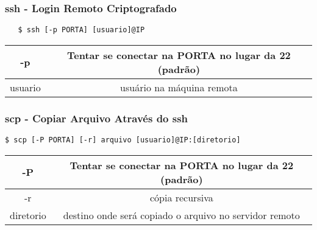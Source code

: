 \documentclass{beamer}
\begin{document}
\begin{frame}[fragile]
   \frametitle{ssh - Login Remoto Criptografado}
   \begin{verbatim}
   $ ssh [-p PORTA] [usuario]@IP
   \end{verbatim}
   \begin{table}
      \begin{tabular}{ c | c }
         -p & Tentar se conectar na PORTA no lugar da 22 (padrão) \\
         \hline 
         usuario & usuário na máquina remota \\ 
      \end{tabular}
   \end{table}
\end{frame}

\begin{frame}[fragile]
   \frametitle{scp - Copiar Arquivo Através do ssh}
   \begin{verbatim}
$ scp [-P PORTA] [-r] arquivo [usuario]@IP:[diretorio]
   \end{verbatim}
   \begin{table}
      \begin{tabular}{ c | c }
         -P & Tentar se conectar na PORTA no lugar da 22 (padrão) \\
         \hline 
         -r & cópia recursiva \\ 
         \hline
         diretorio & destino onde será copiado o arquivo no servidor remoto \\ 
      \end{tabular}
   \end{table}
\end{frame}
\end{document}
